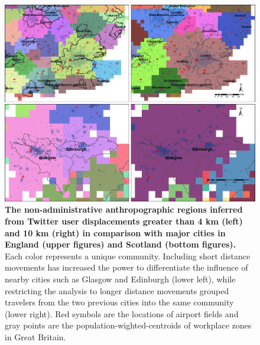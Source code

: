 \documentclass[]{tGIS2e}
\begin{document}
\begin{figure}
\begin{center}
\includegraphics[width=1.0\linewidth]{./figure/S6_community_london}
\caption{{\bf The non-administrative anthropographic regions inferred from Twitter user displacements greater than 4 km (left) and 10 km (right) in comparison with major cities in England (upper figures) and Scotland (bottom figures).}  Each color represents a unique community. Including short distance movements has increased the power to differentiate the influence of nearby cities such as Glasgow and Edinburgh (lower left), while restricting the analysis to longer distance movements grouped travelers from the two previous cities into the same community (lower right). Red symbols are the locations of airport fields and gray points are the population-wighted-centroids of workplace zones in Great Britain.}
\label{S6_Fig}
\end{center}
\end{figure}
\end{document}
